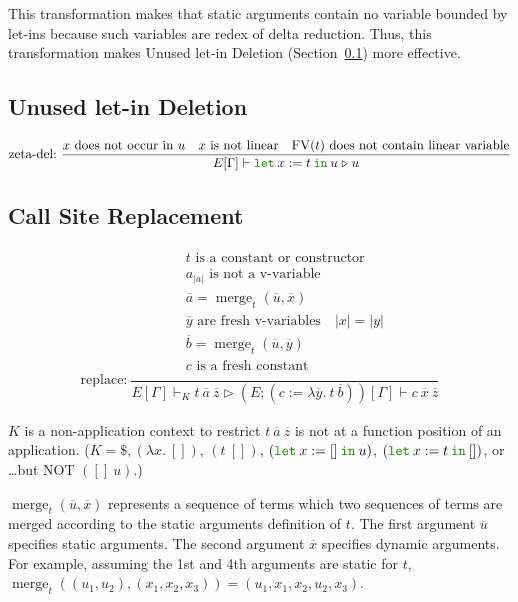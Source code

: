 \documentclass[a4paper,fleqn]{article}
\newcommand{\kwlet}{\mbox{\color{mygreen}\ttfamily let}}
\newcommand{\kwin}{\mbox{\color{mygreen}\ttfamily in}}
\newcommand{\lam}[2]{\lambda #1.\:#2}
\newcommand{\glodefB}[2]{(#1:=#2)}
\newcommand{\letin}[3]{\kwlet\:#1:=#2\:\kwin\:#3}
\DeclareMathOperator{\FV}{FV}
\DeclareMathOperator{\merg}{merge}
\newcommand{\secref}[1]{Section~\ref{#1}}
\newcommand{\reltri}{\mathrel{\triangleright}}
\newcommand{\rep}[1]{\overline{#1}}
\begin{document}
This transformation makes that static arguments contain no variable bounded by let-ins
because such variables are redex of delta reduction.
Thus, this transformation makes Unused let-in Deletion (\secref{sec:let-in-deletion}) more effective.

\subsection{Unused let-in Deletion}\label{sec:let-in-deletion}

\begin{gather*}
  \text{zeta-del:}~
    \dfrac{
      \text{$x$ does not occur in $u$} \quad \text{$x$ is not linear} \quad \text{$\FV(t)$ does not contain linear variable}
    }{E[\Gamma] \vdash \letin{x}{t}{u}
                       \reltri
                       u
    }
\end{gather*}

\subsection{Call Site Replacement}\label{sec:call-site-replacement}

\begin{gather*}
  \text{replace:}~
    \dfrac{
      \begin{gathered}
        \text{$t$ is a constant or constructor} \\
        \text{$a_{|a|}$ is not a v-variable} \\
        \rep{a} = \merg_t(\rep{u}, \rep{x}) \\
        \text{$\rep{y}$ are fresh v-variables} \quad
        |x| = |y| \\
        \rep{b} = \merg_t(\rep{u}, \rep{y}) \\
        \text{$c$ is a fresh constant} \\
      \end{gathered}
    }{E[\Gamma] \vdash_K t\:\rep{a}\:\rep{z}
      \reltri
      (E;\glodefB{c}{\lam{\rep{y}}{t\:\rep{b}}})[\Gamma] \vdash c\:\rep{x}\:\rep{z}
    }
\end{gather*}

$K$ is a non-application context to restrict $t\:\rep{a}\:\rep{z}$ is not at a function position of an application.
($K = \$, (\lam{x}{[]})$, $(t\:[])$, $(\letin{x}{[]}{u})$, $(\letin{x}{t}{[]})$, or \ldots but NOT $([]\:u)$.)

$\merg_t(\rep{u}, \rep{x})$ represents a sequence of terms which two sequences of terms are merged according to the static arguments definition of $t$.
The first argument $\rep{u}$ specifies static arguments.
The second argument $\rep{x}$ specifies dynamic arguments.
For example, assuming the 1st and 4th arguments are static for $t$, $\merg_t((u_1, u_2), (x_1, x_2, x_3)) = (u_1, x_1, x_2, u_2, x_3)$.
\end{document}
